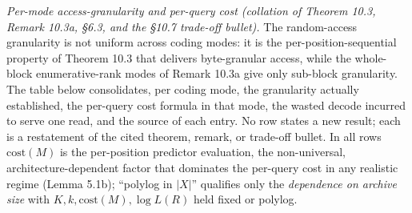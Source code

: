 \documentclass[
]{article}
\begin{document}
\emph{Per-mode access-granularity and per-query cost (collation of
Theorem 10.3, Remark 10.3a, §6.3, and the §10.7 trade-off bullet).} The
random-access granularity is not uniform across coding modes: it is the
per-position-sequential property of Theorem 10.3 that delivers
byte-granular access, while the whole-block enumerative-rank modes of
Remark 10.3a give only sub-block granularity. The table below
consolidates, per coding mode, the granularity actually established, the
per-query cost formula in that mode, the wasted decode incurred to serve
one read, and the source of each entry. No row states a new result; each
is a restatement of the cited theorem, remark, or trade-off bullet.
In all rows $\mathrm{cost}(M)$ is the per-position predictor evaluation,
the non-universal, architecture-dependent factor that dominates the
per-query cost in any realistic regime (Lemma 5.1b); ``polylog in $|X|$''
qualifies only the \emph{dependence on archive size} with
$K,k,\mathrm{cost}(M),\log L(R)$ held fixed or polylog.
\end{document}
